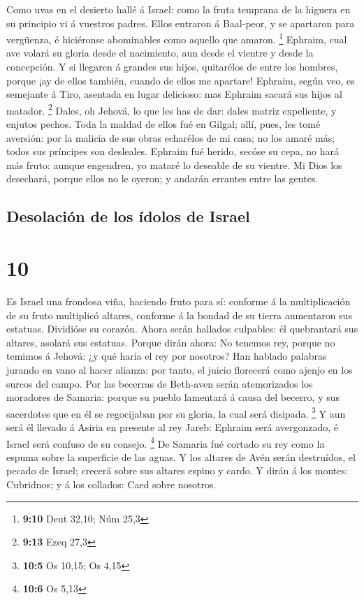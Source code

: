  Como uvas en el desierto hallé á Israel: como la fruta
temprana de la higuera en su principio vi á vuestros padres. Ellos
entraron á Baal-peor, y se apartaron para vergüenza, é hiciéronse
abominables como aquello que amaron. \footnote{\textbf{9:10} Deut 32,10;
  Núm 25,3}  Ephraim, cual ave volará su gloria desde el
nacimiento, aun desde el vientre y desde la concepción.  Y
si llegaren á grandes sus hijos, quitarélos de entre los hombres, porque
¡ay de ellos también, cuando de ellos me apartare! 
Ephraim, según veo, es semejante á Tiro, asentada en lugar delicioso:
mas Ephraim sacará sus hijos al matador. \footnote{\textbf{9:13} Ezeq
  27,3}  Dales, oh Jehová, lo que les has de dar: dales
matriz expeliente, y enjutos pechos.  Toda la maldad de
ellos fué en Gilgal; allí, pues, les tomé aversión: por la malicia de
sus obras echarélos de mi casa; no los amaré más; todos sus príncipes
son desleales.  Ephraim fué herido, secóse su cepa, no hará
más fruto: aunque engendren, yo mataré lo deseable de su vientre.
 Mi Dios los desechará, porque ellos no le oyeron; y
andarán errantes entre las gentes.

\hypertarget{desolaciuxf3n-de-los-uxeddolos-de-israel}{%
\subsection{Desolación de los ídolos de
Israel}\label{desolaciuxf3n-de-los-uxeddolos-de-israel}}

\hypertarget{section-9}{%
\section{10}\label{section-9}}

 Es Israel una frondosa viña, haciendo fruto para sí:
conforme á la multiplicación de su fruto multiplicó altares, conforme á
la bondad de su tierra aumentaron sus estatuas.  Dividióse
su corazón. Ahora serán hallados culpables: él quebrantará sus altares,
asolará sus estatuas.  Porque dirán ahora: No tenemos rey,
porque no temimos á Jehová: ¿y qué haría el rey por nosotros?
 Han hablado palabras jurando en vano al hacer alianza: por
tanto, el juicio florecerá como ajenjo en los surcos del campo.
 Por las becerras de Beth-aven serán atemorizados los
moradores de Samaria: porque su pueblo lamentará á causa del becerro, y
sus sacerdotes que en él se regocijaban por su gloria, la cual será
disipada. \footnote{\textbf{10:5} Os 10,15; Os 4,15}  Y aun
será él llevado á Asiria en presente al rey Jareb: Ephraim será
avergonzado, é Israel será confuso de su consejo. \footnote{\textbf{10:6}
  Os 5,13}  De Samaria fué cortado su rey como la espuma
sobre la superficie de las aguas.  Y los altares de Avén
serán destruídos, el pecado de Israel; crecerá sobre sus altares espino
y cardo. Y dirán á los montes: Cubridnos; y á los collados: Caed sobre
nosotros.

